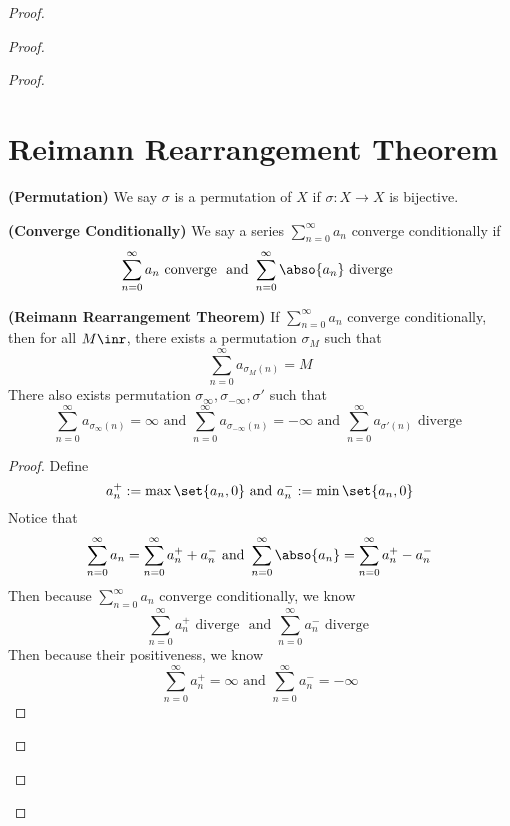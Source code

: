 \documentclass{report}
\begin{document}
\begin{proof}
\begin{proof}
\begin{proof}
\section{Reimann Rearrangement Theorem} 
\begin{definition}
\label{4.8.1}
\textbf{(Permutation)} We say $\sigma$ is a permutation of $X$ if  $\sigma:X\rightarrow X$ is bijective.
\end{definition}
\begin{definition}
\label{4.8.2}
\textbf{(Converge Conditionally)} We say a series $\sum_{n=0}^\infty a_n$ converge conditionally if 
\begin{equation*}
\sum_{n=0}^\infty a_n\text{ converge }\text{ and }\sum_{n=0}^\infty \abso{a_n}\text{ diverge }
\end{equation*}
\end{definition}
\begin{theorem}
\label{4.8.3}
\textbf{(Reimann Rearrangement Theorem)} If  $\sum_{n=0}^\infty a_n$ converge conditionally, then for all $M\inr$, there exists a permutation $\sigma_M$ such that 
\begin{equation*}
\sum_{n=0}^\infty a_{\sigma_M(n)}=M
\end{equation*}
There also exists permutation $\sigma_\infty,\sigma_{-\infty},\sigma'$ such that 
\begin{equation*}
\sum_{n=0}^\infty a_{\sigma_\infty (n)}=\infty\text{ and }\sum_{n=0}^\infty a_{\sigma_{-\infty}(n)}=-\infty\text{ and }\sum_{n=0}^\infty a_{\sigma'(n)}\text{ diverge }
\end{equation*}
\end{theorem}
\begin{proof}
Define 
\begin{equation*}
a_n^+:=\max \set{a_n,0}\text{ and }a_n^-:=\min \set{a_n,0}
\end{equation*}
Notice that 
\begin{equation*}
\sum_{n=0}^\infty a_n=\sum_{n=0}^\infty a_n^++a_n^-\text{ and }\sum_{n=0}^\infty \abso{a_n}=\sum_{n=0}^\infty a_n^+-a_n^-
\end{equation*}
Then because $\sum_{n=0}^\infty a_n$ converge conditionally, we know  
\begin{equation*}
\sum_{n=0}^\infty a_n^+\text{ diverge }\text{ and }\sum_{n=0}^\infty a_n^-\text{ diverge }
\end{equation*}
Then because their positiveness, we know 
\begin{equation*}
\sum_{n=0}^\infty a_n^+=\infty\text{ and }\sum_{n=0}^\infty a_n^-=-\infty

\end{equation*}
\end{proof}
\end{proof}
\end{proof}
\end{proof}
\end{document}
